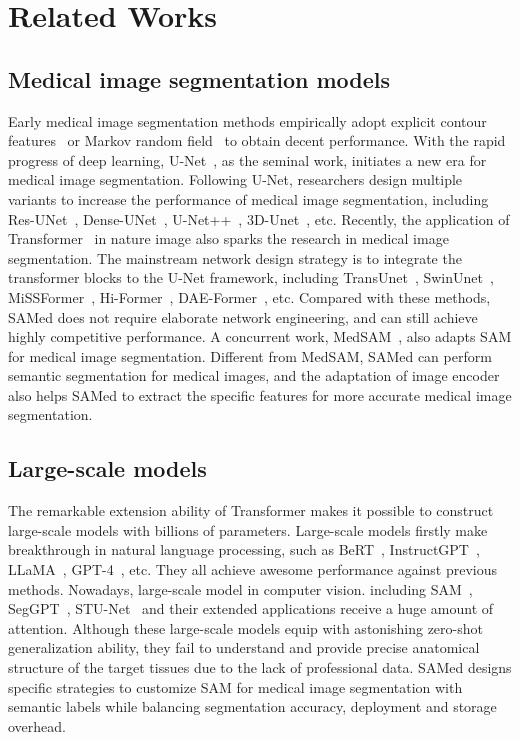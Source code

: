 \documentclass[runningheads]{llncs}
\begin{document}
\section{Related Works}
\subsection{Medical image segmentation models} Early medical image segmentation methods empirically adopt explicit contour features~\cite{1194625} or Markov random field~\cite{held1997markov} to obtain decent performance. With the rapid progress of deep learning, U-Net~\cite{ronneberger2015u}, as the seminal work, initiates a new era for medical image segmentation. Following U-Net, researchers design multiple variants to increase the performance of medical image segmentation, including Res-UNet~\cite{xiao2018weighted}, Dense-UNet~\cite{li2018h}, U-Net++~\cite{zhou2019unetplusplus}, 3D-Unet~\cite{cciccek20163d}, etc. Recently, the application of Transformer~\cite{vaswani2017attention} in nature image also sparks the research in medical image segmentation. The mainstream network design strategy is to integrate the transformer blocks to the U-Net framework, including TransUnet~\cite{chen2021transunet}, SwinUnet~\cite{swinunet}, MiSSFormer~\cite{9994763}, Hi-Former~\cite{heidari2023hiformer}, DAE-Former~\cite{azad2023daeformer}, etc. Compared with these methods, SAMed does not require elaborate network engineering, and can still achieve highly competitive performance. A concurrent work, MedSAM~\cite{MedSAM}, also adapts SAM for medical image segmentation. Different from MedSAM, SAMed can perform semantic segmentation for medical images, and the adaptation of image encoder also helps SAMed to extract the specific features for more accurate medical image segmentation.

\subsection{Large-scale models} The remarkable extension ability of Transformer makes it possible to construct large-scale models with billions of parameters. Large-scale models firstly make breakthrough in natural language processing, such as BeRT~\cite{kenton2019bert}, InstructGPT~\cite{ouyang2022training}, LLaMA~\cite{touvron2023llama}, GPT-4~\cite{openai2023gpt4}, etc. They all achieve awesome performance against previous methods. Nowadays, large-scale model in computer vision. including SAM~\cite{kirillov2023segment}, SegGPT~\cite{SegGPT}, STU-Net~\cite{huang2023stu} and their extended applications receive a huge amount of attention. Although these large-scale models equip with astonishing zero-shot generalization ability, they fail to understand and provide precise anatomical structure of the target tissues due to the lack of professional data. SAMed designs specific strategies to customize SAM for medical image segmentation with semantic labels while balancing segmentation accuracy, deployment and storage overhead.
\end{document}
